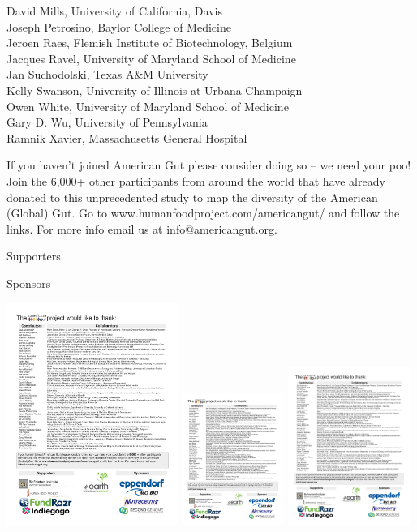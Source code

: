 \documentclass[10pt,letterpaper]{article}
\begin{document}
{{David Mills, University of California, Davis\\
Joseph Petrosino, Baylor College of Medicine\\
Jeroen Raes, Flemish Institute of Biotechnology, Belgium\\
Jacques Ravel, University of Maryland School of Medicine\\
Jan Suchodolski, Texas A\&M University\\
Kelly Swanson, University of Illinois at Urbana-Champaign\\
Owen White, University of Maryland School of Medicine\\
Gary D. Wu, University of Pennsylvania\\
Ramnik Xavier, Massachusetts General Hospital
}
}

\begin{framed}
If you haven't joined American Gut please consider doing so -- we need your poo!  Join the 6,000+ other participants from around the world that have already donated to this unprecedented study to map the diversity of the American (Global) Gut.  Go to www.humanfoodproject.com/americangut/ and follow the links.  For more info email us at info@americangut.org.
\end{framed}

\colorbox{agpGray}{\parbox{0.66\textwidth}{\vspace{1mm} \large \centering Supporters \vspace{1mm}}}
\hspace{1mm}
\colorbox{agpGray}{\parbox{0.323\textwidth}{\vspace{1mm} \large \centering Sponsors \vspace{1mm}}}

\includegraphics[width=0.42\textwidth]{pdfs-mod1/s1.pdf}
\includegraphics[width=0.25\textwidth]{pdfs-mod1/s2.pdf}
\includegraphics[width=0.3\textwidth]{pdfs-mod1/s3.pdf}
\end{document}
